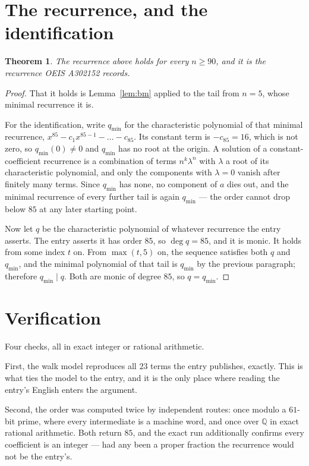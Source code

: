 \documentclass[11pt,a4paper]{article}
\theoremstyle{plain}
\newtheorem{theorem}{Theorem}
\theoremstyle{definition}
\begin{document}
\section{The recurrence, and the identification}

\begin{theorem}
The recurrence above holds for every $n\ge90$, and it is the recurrence OEIS A302152 records.
\end{theorem}

\begin{proof}
That it holds is Lemma~\ref{lem:bm} applied to the tail from $n=5$, whose minimal
recurrence it is.

For the identification, write $q_{\min}$ for the characteristic polynomial of that minimal
recurrence, $x^{85}-c_1x^{85-1}-\dots-c_{85}$. Its constant term is
$-c_{85}=16$, which is not zero, so $q_{\min}(0)\neq0$ and $q_{\min}$ has no
root at the origin. A solution of a constant-coefficient recurrence is a combination of terms
$n^{k}\lambda^{n}$ with $\lambda$ a root of its characteristic polynomial, and only the
components with $\lambda=0$ vanish after finitely many terms. Since $q_{\min}$ has none, no
component of $a$ dies out, and the minimal recurrence of every further tail is again
$q_{\min}$ --- the order cannot drop below $85$ at any later starting point.

Now let $q$ be the characteristic polynomial of whatever recurrence the entry asserts. The
entry asserts it has order $85$, so $\deg q=85$, and it is monic. It holds from some
index $t$ on. From $\max(t,5)$ on, the sequence satisfies both $q$ and $q_{\min}$, and
the minimal polynomial of that tail is $q_{\min}$ by the previous paragraph; therefore
$q_{\min}\mid q$. Both are monic of degree $85$, so $q=q_{\min}$.
\end{proof}

\section{Verification}

Four checks, all in exact integer or rational arithmetic.

First, the walk model reproduces all $23$ terms the entry publishes, exactly. This is
what ties the model to the entry, and it is the only place where reading the entry's English
enters the argument.

Second, the order was computed twice by independent routes: once modulo a $61$-bit prime, where
every intermediate is a machine word, and once over $\mathbb{Q}$ in exact rational arithmetic.
Both return $85$, and the exact run additionally confirms every coefficient is an integer
--- had any been a proper fraction the recurrence would not be the entry's.
\end{document}
